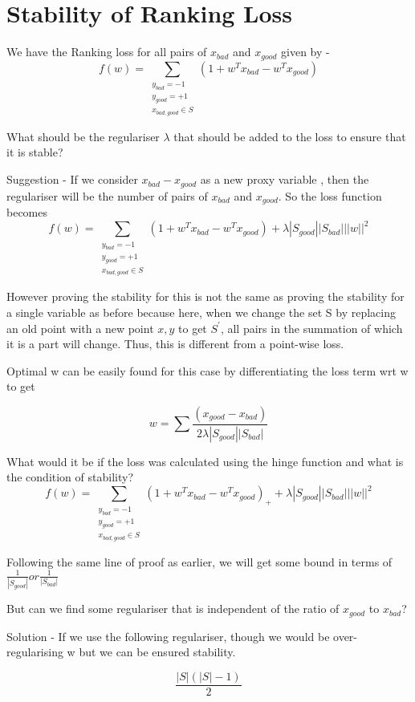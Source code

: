 
\section{Stability of Ranking Loss}
We have the Ranking loss for all pairs of $x_{bad}$ and $x_{good}$ given by -
$${f(w) = \sum_{\substack{y_{bad}=-1 \\ y_{good}=+1 \\ x_{bad,good}\in S}}( 1 + w^{T}x_{bad} -  w^{T}x_{good})}$$

What should be the regulariser $\lambda$ that should be added to the loss to ensure that it is stable?

Suggestion - If we consider $x_{bad} - x_{good}$ as a new proxy variable , then the regulariser will be the number of pairs of $x_{bad}$ and $x_{good}$. So the loss function becomes 
$${f(w) = \sum_{\substack{y_{bad}=-1 \\ y_{good}=+1 \\ x_{bad,good}\in S}}( 1 + w^{T}x_{bad} -  w^{T}x_{good}) + \lambda |S_{good}||S_{bad}|||w||^2}$$

However proving the stability for this is not the same as proving the stability for a single variable as before because here, when we change the set S by replacing an old point with a new point ${x,y}$ to get $S^{'}$, all pairs in the summation of which it is a part will change. Thus, this is different from a point-wise loss. 

Optimal w can be easily found for this case by differentiating the loss term wrt w to get

$${w = \sum\frac{(x_{good} - x_{bad})}{2\lambda|S_{good}||S_{bad}|}}$$

What would it be if the loss was calculated using the hinge function and what is the condition of stability?
$${f(w) = \sum_{\substack{y_{bad}=-1 \\ y_{good}=+1 \\ x_{bad,good}\in S}}( 1 + w^{T}x_{bad} -  w^{T}x_{good})_{+} + \lambda |S_{good}||S_{bad}|||w||^2}$$

Following the same line of proof as earlier, we will get some bound in terms of ${\frac{1}{|S_{good}|} or \frac{1}{|S_{bad}|}}$

But can we find some regulariser that is independent of the ratio of $x_{good}$ to $x_{bad}$?

Solution - If we use the following regulariser, though we would be over-regularising w but we can be ensured stability.

$${\frac {|S|(|S|-1)}{2}}$$
